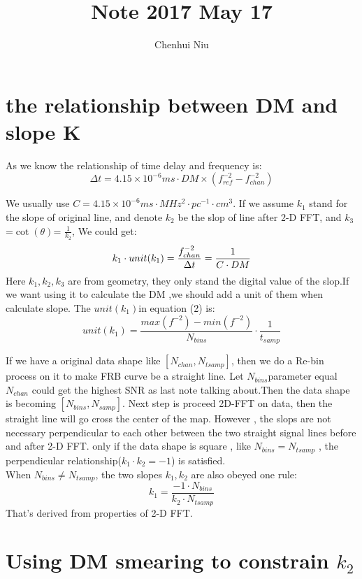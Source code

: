 \documentclass{article}
\title{Note 2017 May 17}
\author{Chenhui Niu}
\begin{document}
\maketitle
\section{the relationship between DM and slope K}
As we know the relationship of time delay and frequency is:
\begin{equation}
\Delta t = 4.15 \times 10 ^{-6}ms \cdot DM \times (f^{-2}_{ref} -f^{-2}_{chan})
\end{equation}

We usually use $C = 4.15 \times 10^{-6} ms \cdot MHz^2 \cdot pc^{-1} \cdot cm^3$.
If we assume $k_{1}$ stand for the slope of original line, and denote $k_{2}$ be the slop of line after 2-D FFT, and $k_{3}$=$\cot( \theta)$= $\frac{1}{k_2}$, We could get:
\begin{equation}
\centering  k_1 \cdot unit(k_1) = \frac{f^{-2}_{chan}}{\Delta t} = \frac{1}{C\cdot DM} 
\end{equation}
Here $k_1,k_2,k_3$ are from geometry, they only stand the digital value of the slop.If we want using it to calculate the DM ,we should add a unit of them when calculate slope. The $unit(k_1)$in equation (2) is:
\begin{equation}
unit(k_1)= \frac{max(f^{-2})-min(f^{-2})}{N_{bins}} \cdot \frac{1}{t_{samp}} 
\end{equation}


If we have a original data shape like $[N_{chan},N_{tsamp}]$, then we do a Re-bin process on it to make FRB curve be a straight line. Let $N_{bins}$parameter equal $N_{chan}$ could get the highest SNR as last note talking about.Then the data shape is becoming $[N_{bins}, N_{samp}]$. Next step is proceed 2D-FFT on data, then the straight line will go cross the center of the map. However , the slops are not necessary perpendicular to each other between the two straight signal lines before and after 2-D FFT. only if the data shape is square , like $N_{bins}=N_{tsamp}$ , the perpendicular relationship($k_1\cdot k_2=-1$) is satisfied. \\

When $N_{bins} \neq N_{tsamp}$, the two slopes $k_1,k_2$ are also obeyed one rule:
\begin{equation}
 k_1 =\frac{-1\cdot N_{bins}}{k_2 \cdot N_{tsamp}}
\end{equation}That's derived from properties of 2-D FFT.
\section{Using DM smearing to constrain $k_2$}
\end{document}
